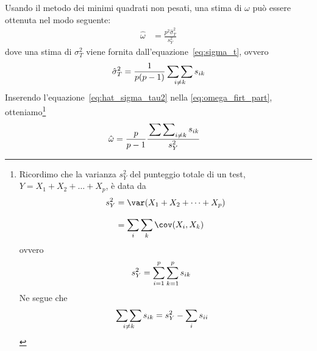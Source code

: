 Usando il metodo dei minimi quadrati non pesati, una stima  di $\omega$ può essere ottenuta nel modo seguente: 
\begin{align}
\hat{\omega} &= \frac{p^2 \hat{\sigma}_T^2}{s_Y^2}
\label{eq:omega_firt_part}
\end{align}
dove una stima di $\sigma_T^2$ viene fornita dall'equazione~\ref{eq:sigma_t}, ovvero
\begin{equation}
\hat{\sigma}_T^2 = \frac{1}{p(p-1)} \sideset{}{} {\sum \sum}_{i \neq k} s_{ik}
\label{eq:hat_sigma_tau2}
\end{equation}
 Inserendo l'equazione~\ref{eq:hat_sigma_tau2} nella \ref{eq:omega_firt_part}, otteniamo\footnote{
 Ricordimo che la varianza $s_Y^2$ del punteggio totale di un
  test, $Y = X_1 + X_2 + \dots + X_p$, è data da
\begin{align}
s_Y^2 &= \var(X_1 + X_2 + \dots + X_p)\notag\\[8pt]
&= \sum_i \sum_k \cov (X_i, X_k)\notag
\end{align}
ovvero
\begin{align}
s^2_Y &= \sum_{i=1}^p \sum_{k=1}^p s_{ik}\notag
\end{align}
Ne segue che
\begin{align}
\sideset{}{} {\sum \sum}_{i \neq k} s_{ik} &= s^2_Y - \sum_i s_{ii}\notag
\end{align}
 }
\begin{align}
\hat{\omega} &= \frac{p}{p-1}\frac{\sideset{}{} {\sum \sum}_{i \neq k} s_{ik}}{s_Y^2}
\end{align}

%
%
%

